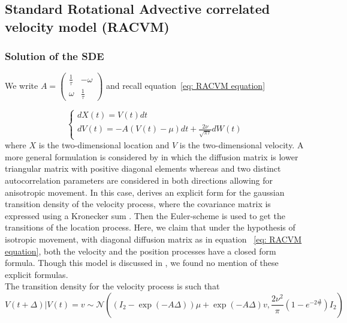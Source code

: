 \documentclass[11pt]{article}
\newcommand {\1}{\mathbb{1}}
\begin{document}
\subsection{Standard Rotational Advective correlated velocity model (RACVM)}
\label{section: RACVM}

\subsubsection{Solution of the SDE}

We write $A=\begin{pmatrix} 
	\frac{1}{\tau} & -\omega \\
	\omega & \frac{1}{\tau}
\end{pmatrix}$ and recall equation~\ref{eq: RACVM equation}

\begin{equation*} \left\{
	\begin{array}{l}
		dX(t)=V(t)dt \\
		dV(t)=-A(V(t)-\mu)dt+\frac{2\nu}{\sqrt{\pi \tau}} dW(t) 
	\end{array}
	\right.
	\label{eq: RACVM equation bis}
\end{equation*}
where $X$ is the two-dimensional location and $V$ is the two-dimensional velocity.
A more general formulation is considered by \cite{albertsen_generalizing_2018} in which the diffusion matrix is lower triangular matrix with positive diagonal elements whereas and two distinct autocorrelation parameters are considered in both directions allowing for anisotropic movement.
In this case, \cite{albertsen_generalizing_2018} derives an explicit form for the gaussian transition density of the velocity process, where the covariance matrix is expressed using a Kronecker sum \cite{albertsen_generalizing_2018}. Then the Euler-scheme is used to get the transitions of the location process. Here, we claim that under the hypothesis of isotropic movement, with diagonal diffusion matrix as in equation ~\ref{eq: RACVM equation}, both the velocity and the position processes have a closed form formula. Though this model is discussed in \cite{gurarie_correlated_2017}, we found no mention of these explicit formulas. \\

The transition density for the velocity process is such that 
\begin{equation}V(t+\Delta) \vert V(t)=v \sim \mathcal{N}\left( (I_2-\exp(-A\Delta))\mu + \exp(-A\Delta)v, \frac{2\nu^2}{\pi}(1-e^{-2\frac{\Delta}{\tau}}) I_2 \right) 
\end{equation}
\end{document}
